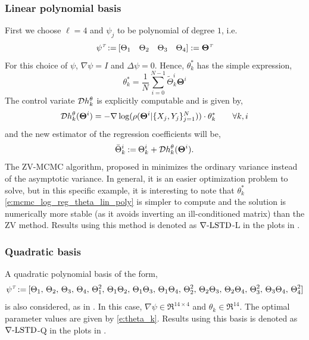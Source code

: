 \noindent \subsubsection*{Linear polynomial basis}
First we choose $\ell=4$ and $\psi_j$ to be polynomial of degree $1$, i.e.
\begin{equation}
\psi^\transpose \eqdef [ \Theta_1 \quad \Theta_2 \quad \Theta_3 \quad \Theta_4] := \boldsymbol{\Theta}^\transpose
\label{e:mcmc_log_reg_linear}
\end{equation}
For this choice of $\psi$,  $\nabla \psi = I$ and $ \Delta \psi = 0$. Hence, $\theta^*_k$ has the simple expression,
\begin{equation}
\theta^*_k = \frac{1}{N} \sum_{i=0}^{N-1} \tilde{\Theta}_k^i \boldsymbol{\Theta}^i
\label{e:mcmc_log_reg_theta_lin_poly}
\end{equation}
The control variate ${\cal D} h^\theta_k$ is explicitly computable and is given by,
\[
{\cal D} h^\theta_k(\boldsymbol{\Theta}^i) = -\nabla \log(\rho(\boldsymbol{\Theta}^i|\{X_j,Y_j\}_{j=1}^N)) \cdot \theta^*_k \qquad \forall k, i
\]
and the new estimator of the regression coefficients will be,
\[
\bar{\Theta}^i_k \mathbin{:=} \Theta^i_k + {\cal D} h^\theta_k(\boldsymbol{\Theta}^i).
\]
The ZV-MCMC algorithm, proposed in \cite{papmirgir14} minimizes the ordinary variance instead of the asymptotic variance. In general, it is an easier optimization problem to solve, but in this specific example, it is interesting to note that $\theta_k^*$ \eqref{e:mcmc_log_reg_theta_lin_poly} is simpler to compute and the solution is numerically more stable (as it avoids inverting an ill-conditioned matrix) than the ZV method. Results using this method is denoted as $\nabla\text{-LSTD}$-L in the plots in . 

\noindent \subsubsection*{Quadratic basis}
A quadratic polynomial basis of the form,
\begin{equation}
\psi^\transpose \eqdef [\Theta_1, \, \Theta_2, \, \Theta_3, \, \Theta_4, \, \Theta_1^2, \, \Theta_1 \Theta_2, \, \Theta_1\Theta_3, \, \Theta_1 \Theta_4, \, \Theta_2^2, \, \Theta_2\Theta_3, \, \Theta_2\Theta_4, \, \Theta_3^2, \, \Theta_3 \Theta_4, \, \Theta_4^2] 
\label{e:mcmc_log_reg_quadratic}
\end{equation}
is also considered, as in \cite{papmirgir14}.  In this case, $\nabla \psi \in \Re^{14 \times 4}$ and $\theta_k \in \Re^{14}$. The optimal parameter values are given by \eqref{e:theta_k}. Results using this basis is denoted as $\nabla\text{-LSTD}$-Q in the plots in .

